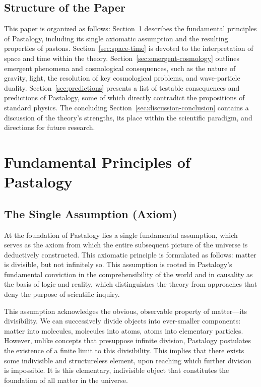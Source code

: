 \documentclass[pdflatex,sn-mathphys-num]{sn-jnl}
\begin{document}
\subsection{Structure of the Paper}\label{subsec:structure}

This paper is organized as follows: Section~\ref{sec:fundamentals} describes the fundamental principles of Pastalogy, including its single axiomatic assumption and the resulting properties of pastons. Section~\ref{sec:space-time} is devoted to the interpretation of space and time within the theory. Section~\ref{sec:emergent-cosmology} outlines emergent phenomena and cosmological consequences, such as the nature of gravity, light, the resolution of key cosmological problems, and wave-particle duality. Section~\ref{sec:predictions} presents a list of testable consequences and predictions of Pastalogy, some of which directly contradict the propositions of standard physics. The concluding Section~\ref{sec:discussion-conclusion} contains a discussion of the theory's strengths, its place within the scientific paradigm, and directions for future research.

\section{Fundamental Principles of Pastalogy}\label{sec:fundamentals}

\subsection{The Single Assumption (Axiom)}\label{subsec:axiom}

At the foundation of Pastalogy lies a single fundamental assumption, which serves as the axiom from which the entire subsequent picture of the universe is deductively constructed. This axiomatic principle is formulated as follows: matter is divisible, but not infinitely so. This assumption is rooted in Pastalogy's fundamental conviction in the comprehensibility of the world and in causality as the basis of logic and reality, which distinguishes the theory from approaches that deny the purpose of scientific inquiry.

This assumption acknowledges the obvious, observable property of matter---its divisibility. We can successively divide objects into ever-smaller components: matter into molecules, molecules into atoms, atoms into elementary particles. However, unlike concepts that presuppose infinite division, Pastalogy postulates the existence of a finite limit to this divisibility. This implies that there exists some indivisible and structureless element, upon reaching which further division is impossible. It is this elementary, indivisible object that constitutes the foundation of all matter in the universe.
\end{document}
